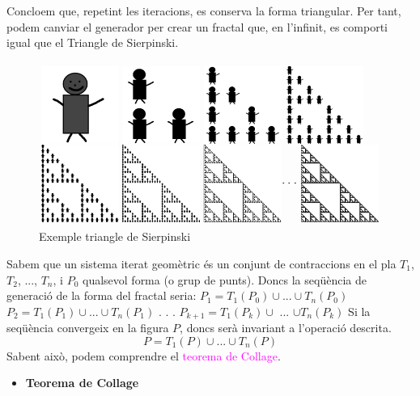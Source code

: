 \documentclass[12pt]{report}
\begin{document}
Concloem que, repetint les iteracions, es conserva la forma triangular. Per tant, podem canviar el generador per crear un fractal que, en l'infinit, es comporti igual que el Triangle de Sierpinski.
\newline
\begin{figure}[H]
 \includegraphics[width=1\textwidth]{IP.PNG}
 \caption{Exemple triangle de Sierpinski}
 \end{figure}
 \justifying
Sabem que un sistema iterat geomètric és un conjunt de contraccions en el pla $T_1$, $T_2$, ..., $T_n$, i $P_0$ qualsevol forma (o grup de punts).
\newline
Doncs la seqüència de generació de la forma del fractal seria:
\newline
$P_1=T_1(P_0)\cup ... \cup T_n(P_0)$
\newline
$P_2=T_1(P_1)\cup ... \cup T_n(P_1)$
\newline
\hspace*{5em} .
\newline
\hspace*{5em} .
\newline
\hspace*{5em} .
\newline
$P_{k+1}=T_1(P_k)\cup$ ... $\cup T_n(P_k)$
\newline
Si la seqüència convergeix en la figura $P$, doncs serà invariant a l'operació descrita.
$$P=T_1(P) \cup ... \cup T_n(P)$$
\newline
Sabent això, podem comprendre el \textcolor{magenta}{teorema de Collage}.
\newline
\newline
\newline
\newline
\newline
\begin{itemize}
    \item \textbf{Teorema de Collage}
\end{itemize} 
\justifying
\end{document}
